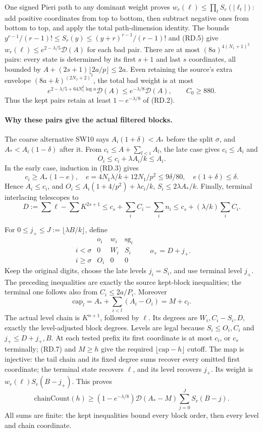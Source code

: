 One signed Pieri path to any dominant weight proves
$w_r(\ell)\le\prod_tS_r(|\ell_t|)$: add positive coordinates from
top to bottom, then subtract negative ones from bottom to top, and
apply the total path-dimension identity. The bounds
$y^{r-1}/(r-1)!\le S_r(y)\le(y+r)^{r-1}/(r-1)!$ and (RD.5)
give $w_r(\ell)\le e^{2-\lambda/5}\mathcal D(A)$ for each bad pair.
There are at most $(8a)^{4(N_1+1)^2}$ pairs: every state is determined
by its first $s+1$ and last $s$ coordinates, all bounded by
$A+(2s+1)\lfloor2a/p\rfloor\le2a$.
Even retaining the source's extra envelope
$(8a+k)^{(2N_1+2)^2}$, the total bad weight is at most
\[
 e^{2-\lambda/5+64N_1^2\log a}\mathcal D(A)
 \le e^{-\lambda/8}\mathcal D(A),\qquad C_0\ge880.
 \tag{RD.6}
\]
Thus the kept pairs retain at least $1-e^{-\lambda/8}$ of (RD.2).

\paragraph{Why these pairs give the actual filtered blocks.}
The coarse alternative SW10 says
$A_i(1+\delta)<A_*$ before the split $\sigma$, and
$A_*<A_i(1-\delta)$ after it. From
$c_i\le A+\sum_{l<i}A_l$, the late case gives $c_i\le A_i$ and
\[
                 O_i\le c_i+\lambda A_i/k\le A_i.
\]
In the early case, induction in (RD.3) gives
\[
 c_i\ge A_*(1-e),\quad
 e=4N_1\lambda/k+12N_1/p^2\le9\delta/80,
 \quad e(1+\delta)\le\delta.
\]
Hence $A_i\le c_i$, and
$O_i\le A_i(1+4/p^2)+\lambda c_i/k$,
$S_i\le2\lambda A_*/k$.
Finally, terminal interlacing telescopes to
\[
 D:=\sum\ell-\sum K^{2s+1}
 \le c_s+\sum_iC_i-\sum_i n_i
 \le c_s+(\lambda/k)\sum_iC_i.
\]

For $0\le j_+\le J:=\lfloor\lambda B/k\rfloor$, define
\[
\begin{array}{c|ccc}
 &o_i&w_i&\mathrm{sg}_i\\ \hline
 i<\sigma&0&W_i&S_i\\
 i\ge\sigma&O_i&0&0
\end{array}
 \qquad o_+=D+j_+.
\]
Keep the original digits, choose the late levels $j_i=S_i$, and use
terminal level $j_+$. The preceding inequalities are exactly the
source kept-block inequalities; the terminal one follows also from
$C_i\le2a/P_i$. Moreover
\[
 \mathrm{cap}_l=A_*+\sum_{i<l}(A_i-O_i)=M+c_l.
 \tag{RD.7}
\]
The actual level chain is $K^{n+1}$, followed by $\ell$.
Its degrees are $W_i,C_i-S_i,D$, exactly the level-adjusted block
degrees. Levels are legal because $S_i\le O_i,C_i$ and $j_+\le D+j_+,B$.
At each tested prefix its first coordinate is at most $c_i$, or $c_s$
terminally; (RD.7) and $M\ge h$ give the required
$\lfloor\mathrm{cap}-h\rfloor$ cutoff.
The map is injective: the tail chain and its fixed degree sums recover
every omitted first coordinate; the terminal state recovers $\ell$,
and its level recovers $j_+$. Its weight is
$w_r(\ell)S_r(B-j_+)$. This proves
\[
 \mathrm{chainCount}(h)\ge
 (1-e^{-\lambda/8})\mathcal D(A_*-M)
                  \sum_{j=0}^{J}S_r(B-j).
 \tag{RD.8}
\]
All sums are finite: the kept inequalities bound every block order,
then every level and chain coordinate.

